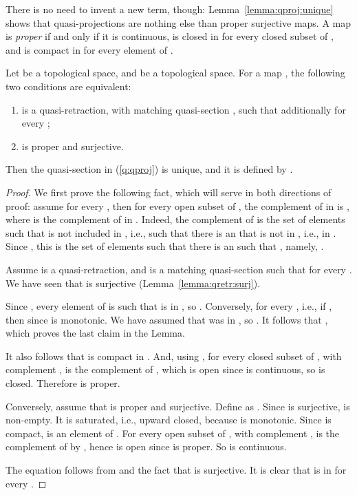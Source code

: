 \documentclass{LMCS}
\begin{document}
There is no need to invent a new term, though:
Lemma~\ref{lemma:qproj:unique} shows that quasi-projections are
nothing else than proper surjective maps.
A map  is {\em proper\/} if and only if it is continuous,
 is closed in  for every closed subset  of , and
 is compact in  for every element  of 
\cite[Lemma~VI-6.21~]{GHKLMS:contlatt}.
\begin{lem}
  \label{lemma:qproj:unique}
  Let  be a topological space, and  be a  topological
  space.  For a map , the following two conditions are
  equivalent:
  \begin{enumerate}[\em(1)]
  \item\label{q:qproj}  is a quasi-retraction, with matching
    quasi-section , such that additionally  for every ;
  \item  is proper and surjective.
  \end{enumerate}
  Then the quasi-section  in (\ref{q:qproj}) is unique, and it is
  defined by .
\end{lem}
\begin{proof}
  We first prove the following fact, which will serve in both
  directions of proof:  assume  for
  every , then for every open subset  of , the
  complement of  in  is , where 
  is the complement of  in .  Indeed, the complement of
   is the set of elements  such that  is not included in , i.e., such that there is an  that is not in , i.e., in .  Since , this is the set of elements  such that there is an  such that , namely, .

  Assume  is a quasi-retraction, and  is a matching
  quasi-section such that  for every .  We
  have seen that  is surjective (Lemma~\ref{lemma:qretr:surj}).

  Since , every element  of 
  is such that  is in , so .  Conversely, for every , i.e., if
  , then  since  is
  monotonic.  We have assumed that  was in , so .  It follows that , which proves
  the last claim in the Lemma.

  It also follows that  is compact in .  And,
  using , for every closed subset  of , with complement
  ,  is the complement of , which
  is open since  is continuous, so  is closed.
  Therefore  is proper.

  Conversely, assume that  is proper and surjective.  Define  as .  Since  is surjective,  is
  non-empty.  It is saturated, i.e., upward closed, because  is
  monotonic.  Since  is compact,  is an
  element of .  For every open subset  of , with
  complement ,  is the complement of 
  by , hence is open since  is proper.  So  is
  continuous.

  The equation  follows from  and the fact
  that  is surjective.  It is clear that  is in  for every .
\end{proof}
\end{document}
